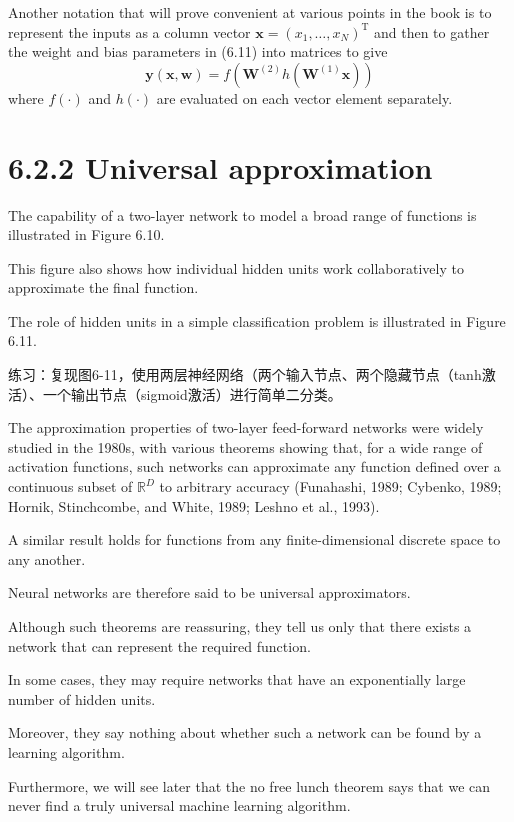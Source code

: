 \documentclass{article}
\begin{document}
Another notation that will prove convenient at various points in the book is to represent the inputs as a column vector $\mathbf{x} = (x_1, \ldots, x_N)^\mathrm{T}$ and then to gather the weight and bias parameters in (6.11) into matrices to give
\begin{equation}
\mathbf{y}(\mathbf{x}, \mathbf{w}) = f\left( \mathbf{W}^{(2)} h\left( \mathbf{W}^{(1)} \mathbf{x} \right) \right) \tag{6.12}
\end{equation}
where $f(\cdot)$ and $h(\cdot)$ are evaluated on each vector element separately.


\section{6.2.2 Universal approximation}

The capability of a two-layer network to model a broad range of functions is illustrated in Figure 6.10. 

This figure also shows how individual hidden units work collaboratively to approximate the final function. 

The role of hidden units in a simple classification problem is illustrated in Figure 6.11.

{\color{red}
练习：复现图6-11，使用两层神经网络（两个输入节点、两个隐藏节点（tanh激活）、一个输出节点（sigmoid激活）进行简单二分类。
}

The approximation properties of two-layer feed-forward networks were widely studied in the 1980s, with various theorems showing that, for a wide range of activation functions, such networks can approximate any function defined over a continuous subset of $\mathbb{R}^D$ to arbitrary accuracy (Funahashi, 1989; Cybenko, 1989; Hornik, Stinchcombe, and White, 1989; Leshno et al., 1993). 

A similar result holds for functions from any finite-dimensional discrete space to any another. 

Neural networks are therefore said to be universal approximators.

Although such theorems are reassuring, they tell us only that there exists a network that can represent the required function. 

In some cases, they may require networks that have an exponentially large number of hidden units. 

Moreover, they say nothing about whether such a network can be found by a learning algorithm. 

Furthermore, we will see later that the no free lunch theorem says that we can never find a truly universal machine learning algorithm. 
\end{document}
